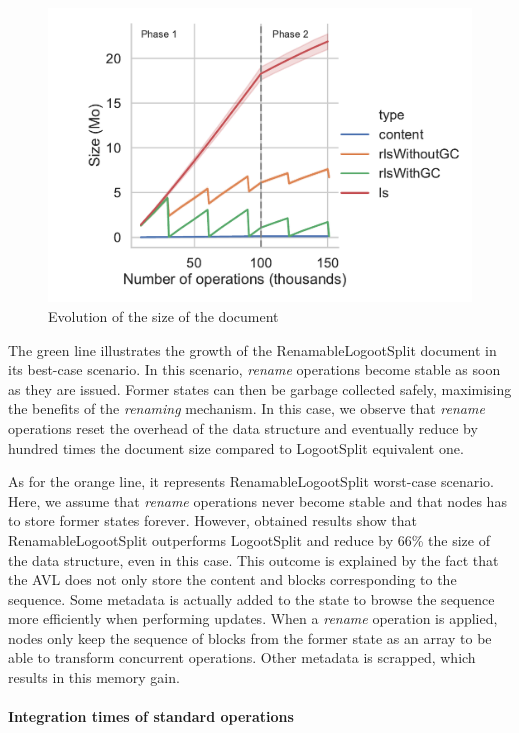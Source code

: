 \documentclass[sigplan,10pt]{acmart}
\begin{document}
\begin{figure}
    \centering
    \includegraphics[width=0.9\columnwidth]{img/snapshots-sizes.pdf}
    \caption{Evolution of the size of the document}
    \label{fig:evolution-document-size}
\end{figure}

The green line illustrates the growth of the RenamableLogootSplit document in its best-case scenario.
In this scenario, \emph{rename} operations become stable as soon as they are issued.
Former states can then be garbage collected safely, maximising the benefits of the \emph{renaming} mechanism.
In this case, we observe that \emph{rename} operations reset the overhead of the data structure and eventually reduce by hundred times the document size compared to LogootSplit equivalent one.

As for the orange line, it represents RenamableLogootSplit worst-case scenario.
Here, we assume that \emph{rename} operations never become stable and that nodes has to store former states forever.
However, obtained results show that RenamableLogootSplit outperforms LogootSplit and reduce by 66\% the size of the data structure, even in this case.
This outcome is explained by the fact that the AVL does not only store the content and blocks corresponding to the sequence.
Some metadata is actually added to the state to browse the sequence more efficiently when performing updates.
When a \emph{rename} operation is applied, nodes only keep the sequence of blocks from the former state as an array to be able to transform concurrent operations.
Other metadata is scrapped, which results in this memory gain.

\paragraph{Integration times of standard operations}
\end{document}
